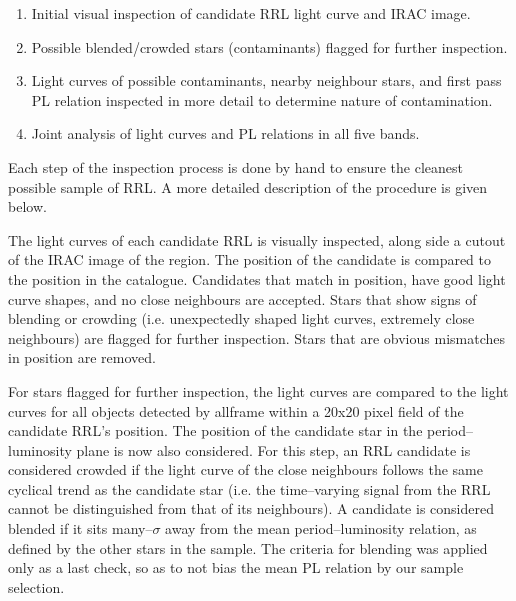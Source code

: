 \documentclass[a4paper,fleqn,usenatbib]{mnras}
\begin{document}
\begin{enumerate}
\item Initial visual inspection of candidate RRL light curve and IRAC image.
\item Possible blended/crowded stars (contaminants) flagged for further inspection.
\item Light curves of possible contaminants, nearby neighbour stars, and first pass PL relation inspected in more detail to determine nature of contamination.
\item Joint analysis of light curves and PL relations in all five bands.
\end{enumerate}

Each step of the inspection process is done by hand to ensure the cleanest possible sample of RRL. A more detailed description of the procedure is given below. 

The light curves of each candidate RRL is visually inspected, along side a cutout of the IRAC image of the region. The position of the candidate is compared to the position in the \citet{20042004A&A...424.1101K} catalogue. Candidates that match in position, have good light curve shapes, and no close neighbours are accepted. Stars that show signs of blending or crowding (i.e. unexpectedly shaped light curves, extremely close neighbours) are flagged for further inspection. Stars that are obvious mismatches in position are removed.

For stars flagged for further inspection, the light curves are compared to the light curves for all objects detected by {\sc allframe} within a 20x20 pixel field of the candidate RRL's position. The position of the candidate star in the period--luminosity plane is now also considered. For this step, an RRL candidate is considered crowded if the light curve of the close neighbours follows the same cyclical trend as the candidate star (i.e. the time--varying signal from the RRL cannot be distinguished from that of its neighbours). A candidate is considered blended if it sits many--$\sigma$ away from the mean period--luminosity relation, as defined by the other stars in the sample. The criteria for blending was applied only as a last check, so as to not bias the mean PL relation by our sample selection. 
\end{document}
